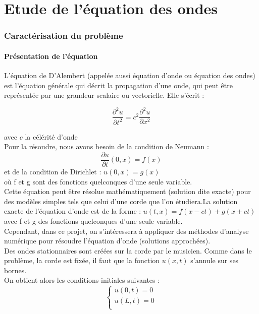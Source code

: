 \part{Etude de l'équation des ondes}

\section{Caractérisation du problème}

\subsection{Présentation de l'équation}

L'équation de D'Alembert (appelée aussi équation d'onde ou équation des ondes) est l'équation générale qui décrit la propagation d'une onde, qui peut être représentée par une grandeur scalaire ou vectorielle. 
Elle s'écrit : 

\begin{equation*}
\frac{\partial^2u}{\partial t^2} = c^{2}\frac{\partial^2u}{\partial x^2}
\end{equation*}
 
    avec $c$ la célérité d'onde \\
Pour la résoudre, nous avons besoin de la condition de Neumann :
\begin{equation*}
\frac{\partial u}{\partial t} (0,x) = f(x)
\end{equation*}
et de la condition de Dirichlet : $u(0,x) = g(x)$\\
où f et g sont des fonctions quelconques d'une seule variable.\\

Cette équation peut être résolue mathématiquement (solution dite exacte) pour des modèles simples tels que celui d'une corde que l'on étudiera.La solution exacte de l'équation d'onde est de la forme :
$u(t,x) = f(x-ct) + g(x+ct)$ avec f et g des fonctions quelconques d'une seule variable.  \\

Cependant, dans ce projet, on s'intéressera à appliquer des méthodes d'analyse numérique pour résoudre l'équation d'onde (solutions approchées).\\

Des ondes stationnaires sont créées sur la corde par le musicien. Comme dans le problème, la corde est fixée, il faut que la fonction $u(x,t)$ s'annule sur ses bornes.\\
On obtient alors les conditions initiales suivantes :\\
\begin{equation*}
\left \{
\begin{array}{rcl}
u(0,t)=0\\
u(L,t)=0\\
\end{array}
\right.
\end{equation*}\\


